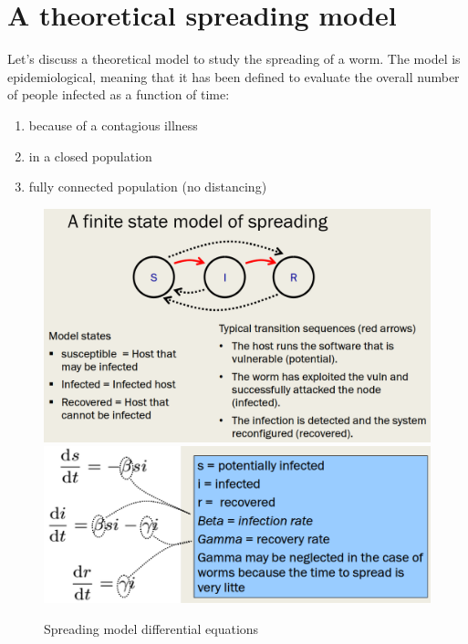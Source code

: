 \section{A theoretical spreading model}
Let's discuss a theoretical model to study the spreading of a
worm.
The model is epidemiological, meaning that it has been defined to evaluate the overall number of people infected as a function of time:

\begin{enumerate}
   \item because of a contagious illness
   \item in a closed population
   \item fully connected population (no distancing)
\end{enumerate}

\begin{figure}[htbp]
   \centering
   \includegraphics[width=0.45\columnwidth]{images/spreadingmodel.png}
   \includegraphics[width=0.45\columnwidth]{images/spreadingmodel_equations.png}
   \caption{Spreading model differential equations}
   \label{fig:spreadingmodel}
\end{figure}

